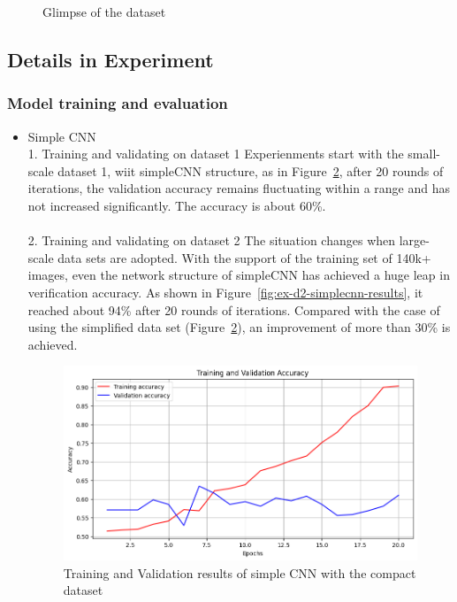 \documentclass[rebuttal]{cvpr}
\begin{document}
\begin{itemize}
\begin{figure}[t]
\begin{minipage}{0.45\linewidth}
   \label{fig:image2}
\end{minipage}
\caption{Glimpse of the dataset}
\label{fig:dataset}
\end{figure}
\end{itemize}


\subsection{Details in Experiment}
\subsubsection{Model training and evaluation}
\begin{itemize}
   \item Simple CNN \\
   1. Training and validating on dataset 1
       Experienments start with the small-scale dataset 1, wiit simpleCNN structure, as in Figure~\ref*{fig:ex-d1-simplecnn-results}, after 20 rounds of iterations, the validation accuracy remains fluctuating within a range and has not increased significantly. The accuracy is about 60\%.  
       \\
       \\
   2. Training and validating on dataset 2
       The situation changes when large-scale data sets are adopted. With the support of the training set of 140k+ images, even the network structure of simpleCNN has achieved a huge leap in verification accuracy. As shown in Figure~\ref*{fig:ex-d2-simplecnn-results}, it reached about 94\% after 20 rounds of iterations. Compared with the case of using the simplified data set (Figure~\ref*{fig:ex-d1-simplecnn-results}), an improvement of more than 30\% is achieved.
       

       \begin{figure}[t]
          \centering
          \includegraphics[width=0.9\linewidth]{images/ex-d1-simplecnn-accuracy-results.png}
          \caption{Training and Validation results of simple CNN with the compact dataset}
          \label{fig:ex-d1-simplecnn-results}
       \end{figure}
       

\end{itemize}
\end{document}
